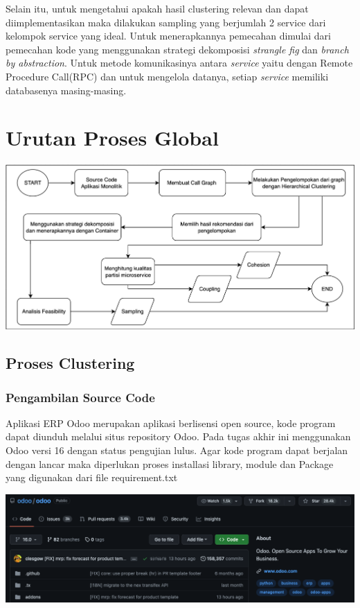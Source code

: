 Selain itu, untuk mengetahui apakah hasil clustering relevan dan dapat diimplementasikan maka dilakukan sampling yang berjumlah 2 service dari kelompok service yang ideal. Untuk menerapkannya pemecahan dimulai dari pemecahan kode yang menggunakan strategi dekomposisi \textit{strangle fig } dan \textit{branch by abstraction}. Untuk metode komunikasinya antara \textit{service} yaitu dengan Remote Procedure Call(RPC) dan untuk mengelola datanya, setiap \textit{service} memiliki databasenya masing-masing.\\

\section{Urutan Proses Global}
\begin{center}
	\includegraphics[width=14cm]{img/bab_3/FlowchartProsesGlobal.png}
	\label{fig:proses_Global}
\end{center}

\subsection{Proses Clustering}

\subsubsection{Pengambilan Source Code}
Aplikasi ERP Odoo merupakan aplikasi berlisensi open source, kode program dapat diunduh melalui situs repository Odoo. Pada tugas akhir ini menggunakan Odoo versi 16 dengan status pengujian lulus. Agar kode program dapat berjalan dengan lancar maka diperlukan proses installasi library, module dan Package yang digunakan dari file requirement.txt
\begin{center}
	\includegraphics[width=14cm]{img/bab_3/github.png}
	\label{fig:github_ss}
\end{center}

